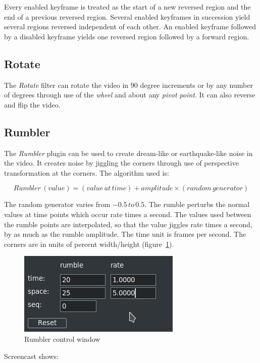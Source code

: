 Every enabled keyframe is treated as the start of a new reversed region and the end of a previous reversed region. Several enabled keyframes in succession yield several regions reversed independent of each other. An enabled keyframe followed by a disabled keyframe yields one reversed region followed by a forward region.

\subsection{Rotate}%
\label{sub:rotate}

The \textit{Rotate} filter can rotate the video in $90$ degree increments or by any number of degrees through use of the \textit{wheel} and about any \textit{pivot point}. It can also reverse and flip the video.

\subsection{Rumbler}%
\label{sub:rumbler}

The \textit{Rumbler} plugin can be used to create dream-like or earthquake-like noise in the video. It creates noise by jiggling the corners through use of perspective transformation at the corners. The algorithm used is:

\[Rumbler\,(value) = (value\, at\, time) + amplitude \times (random\, generator)\]

The random generator varies from $-0.5\, to\, 0.5$. The rumble perturbs the normal values at time points which occur rate times a second. The values used between the rumble points are interpolated, so that the value jiggles rate times a second, by as much as the rumble amplitude. The time unit is frames per second. The corners are in units of percent width/height (figure~\ref{fig:rumbler}).

\begin{figure}[hbtp]
    \centering
    \includegraphics[width=0.45\linewidth]{images/rumbler.png}
    \caption{Rumbler control window}
    \label{fig:rumbler}
\end{figure}

Screencast shows:

